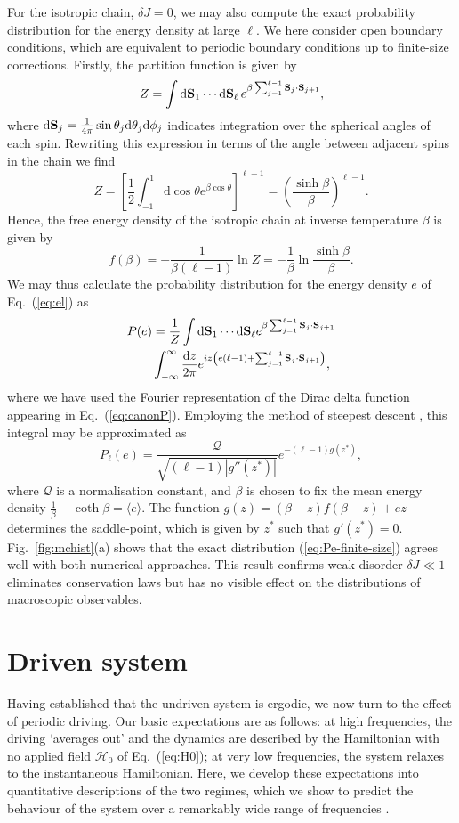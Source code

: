 \documentclass[aps,pre,twocolumn,notitlepage,floats,10pt]{revtex4-1}
\def\d{\mathrm{d}}
\newcommand{\be}{\begin{equation}}
\newcommand{\ee}{\end{equation}}
\newcommand{\beA}{\begin{equation}\begin{aligned}}
\newcommand{\eeA}{\end{aligned}\end{equation}}
\begin{document}
For the isotropic chain, $\delta J = 0$, we may also compute the exact
probability distribution for the energy density at large $\ell$.
We here consider open boundary conditions, which are equivalent to periodic
boundary conditions up to finite-size corrections.
Firstly, the partition function is given by
\be
Z = \int \d{\bf S}_1 \cdots \d{\bf S}_\ell\,
e^{\beta \sum_{j=1}^{\ell-1} {\bf S}_j \cdot {\bf S}_{j+1}}
,
\ee
where $\d {\bf S}_j = \frac{1}{4\pi} \sin \theta_j \d \theta_j \d \phi_j$
indicates integration over the spherical angles of each spin.
Rewriting this expression in terms of the angle between adjacent spins in the
chain we find
\be
Z =\left[ \frac{1}{2} \int_{-1}^1 \d \cos \theta e^{\beta \cos\theta} \right]^{\ell-1}
= \left( \frac{\sinh \beta }{\beta } \right)^{\ell-1}
.
\ee
Hence, the free energy density of the isotropic chain at inverse temperature
$\beta$ is given by \cite{Parsons}
\be
f(\beta) = -\frac{1}{\beta(\ell-1)} \ln Z =
-\frac{1}{\beta} \ln \frac{\sinh \beta }{\beta }.
\ee
We may thus calculate the probability distribution for the energy density $e$
of Eq.~(\ref{eq:el}) as
\beA
P(e) &= \frac{1}{Z} \int \d{\bf S}_1 \cdots \d{\bf S}_{\ell} e^{\beta \sum_{j=1}^{\ell-1} {\bf S}_j \cdot {\bf S} _{j+1}}\\
& \int_{-\infty}^\infty \frac{\d z}{2\pi}e^{iz\left( e(\ell-1) + \sum_{j=1}^{\ell-1} {\bf S}_j \cdot {\bf S}_{j+1} \right)},
\eeA
where we have used the Fourier representation of the Dirac delta function
appearing in Eq.~(\ref{eq:canonP}).
Employing the method of steepest descent \cite{erdelyi}, this integral may be
approximated as
\be
P_\ell(e) = \frac{\mathcal{Q}}{\sqrt{(\ell-1) |g''(z^*)|}} e^{-(\ell-1) g(z^*)},
\label{eq:Pe-finite-size}
\ee
where $\mathcal{Q}$ is a normalisation constant,
and $\beta$ is chosen to fix the mean energy density 
$\frac{1}{\beta} - \coth \beta = \langle e \rangle$.
The function $g(z) = (\beta - z)f(\beta-z) + e z$ determines the saddle-point,
which is given by $z^*$ such that $g'(z^*) = 0$.
Fig.~\ref{fig:mchist}(a) shows that the exact distribution
(\ref{eq:Pe-finite-size}) agrees well with both numerical approaches.
This result confirms weak disorder $\delta J \ll 1$ eliminates conservation
laws but has no visible effect on the distributions of macroscopic observables.


\section{Driven system}\label{sec:driven}

Having established that the undriven system is ergodic, we now turn to the
effect of periodic driving.
Our basic expectations are as follows:
at high frequencies, the driving `averages out' and the dynamics are described
by the Hamiltonian with no applied field $\mathcal{H}_0$ of Eq.~(\ref{eq:H0});
at very low frequencies, the system relaxes to the instantaneous Hamiltonian.
Here, we develop these expectations into quantitative descriptions of the two
regimes, which we show to predict the behaviour of the system over a remarkably
wide range of frequencies \cite{short-paper}.
\end{document}
